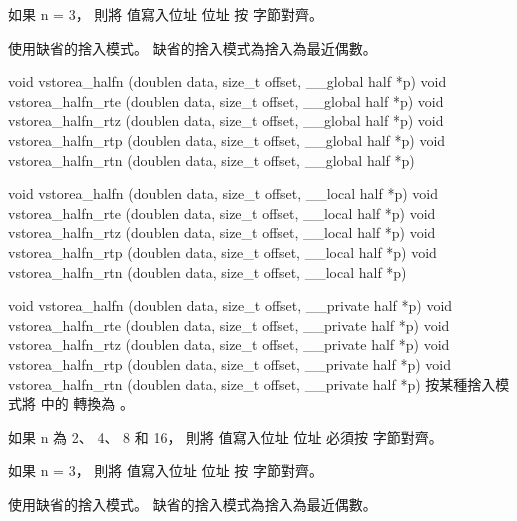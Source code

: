 如果 n = 3，
則將  值寫入位址 
位址  按
  字節對齊。

 使用缺省的捨入模式。
缺省的捨入模式為捨入為最近偶數。
\stopbuffer

void vstorea_halfn (doublen data,
	size_t offset,
	__global half *p)
void vstorea_halfn_rte (doublen data,
	size_t offset,
	__global half *p)
void vstorea_halfn_rtz (doublen data,
	size_t offset,
	__global half *p)
void vstorea_halfn_rtp (doublen data,
	size_t offset,
	__global half *p)
void vstorea_halfn_rtn (doublen data,
	size_t offset,
	__global half *p)

void vstorea_halfn (doublen data,
	size_t offset,
	__local half *p)
void vstorea_halfn_rte (doublen data,
	size_t offset,
	__local half *p)
void vstorea_halfn_rtz (doublen data,
	size_t offset,
	__local half *p)
void vstorea_halfn_rtp (doublen data,
	size_t offset,
	__local half *p)
void vstorea_halfn_rtn (doublen data,
	size_t offset,
	__local half *p)

void vstorea_halfn (doublen data,
	size_t offset,
	__private half *p)
void vstorea_halfn_rte (doublen data,
	size_t offset,
	__private half *p)
void vstorea_halfn_rtz (doublen data,
	size_t offset,
	__private half *p)
void vstorea_halfn_rtp (doublen data,
	size_t offset,
	__private half *p)
void vstorea_halfn_rtn (doublen data,
	size_t offset,
	__private half *p)
\stopbuffer
{}
按某種捨入模式將  中的  轉換為 。

如果 n 為 2、 4、 8 和 16，
則將  值寫入位址 
位址  必須按
  字節對齊。

如果 n = 3，
則將  值寫入位址 
位址  按
  字節對齊。

 使用缺省的捨入模式。
缺省的捨入模式為捨入為最近偶數。
\stopbuffer
